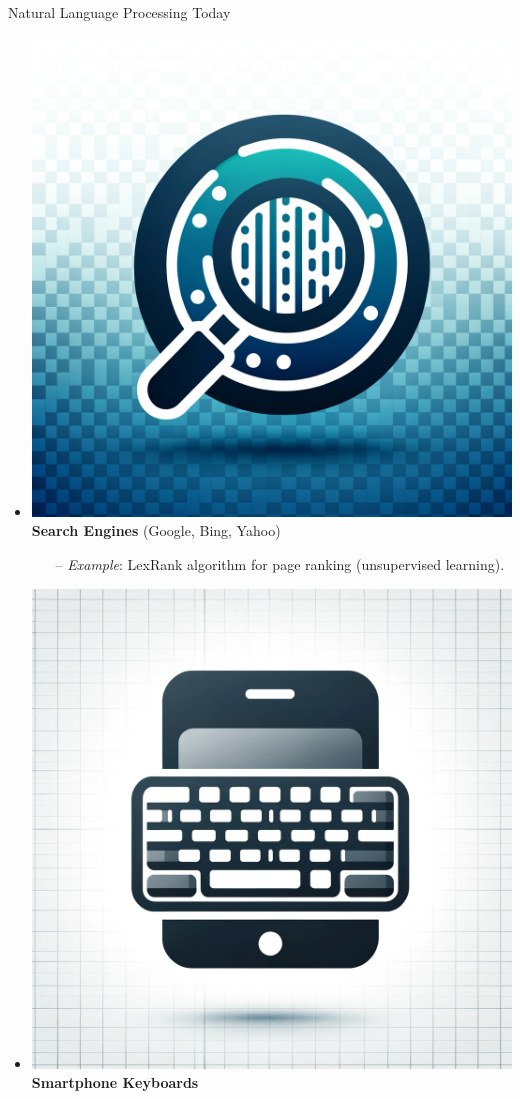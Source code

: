 \documentclass{beamer}
\newenvironment{stepitemize}{\begin{itemize}[<+->]}{\end{itemize} }
\begin{document}
\begin{frame}{Natural Language Processing Today}

\begin{stepitemize}
\item \includegraphics[scale=0.015]{figures/search_engine_icon.png} \textbf{Search Engines} (Google, Bing, Yahoo)
\begin{itemize}
\item[--] \textit{Example}: LexRank algorithm for page ranking (unsupervised learning).
\end{itemize}
\item \includegraphics[scale=0.015]{figures/smartphone_keyboard_icon.png} \textbf{Smartphone Keyboards}

\end{stepitemize}
\end{frame}
\end{document}
